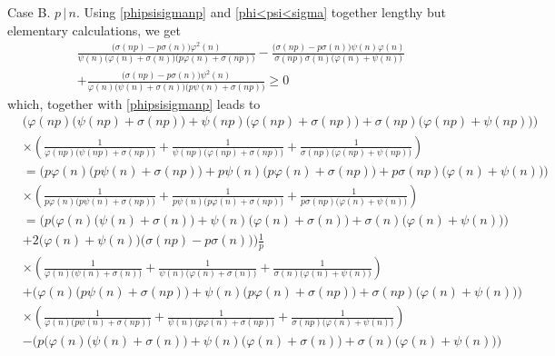 \documentclass[12pt]{article}
\begin{document}
Case B.  \;  $p\,|\,n$. Using \eqref{phipsisigmanp} and \eqref{phi<psi<sigma} together  lengthy but elementary calculations, we get
\begin{align}\label{CaseB}
&\frac{\big(\sigma(np)-p\sigma(n)\big)\varphi^2(n)}{\psi(n)\big(\varphi(n)+\sigma(n)\big)\big(p\varphi(n)+\sigma(np)\big)}
-\frac{\big(\sigma(np)-p\sigma(n)\big)\psi(n)\varphi(n)}{\sigma(np)\sigma(n)\big(\varphi(n)+\psi(n)\big)}\nonumber\\
&+\frac{\big(\sigma(np)-p\sigma(n)\big)\psi^2(n)}{\varphi(n)\big(\psi(n)+\sigma(n)\big)\big(p\psi(n)+\sigma(np)\big)}\geq0
\end{align}
which, together with \eqref{phipsisigmanp} leads to
\begin{align*}
&\Big(\varphi(np)\big(\psi(np)+\sigma(np)\big)+\psi(np)\big(\varphi(np)+\sigma(np)\big)+\sigma(np)\big(\varphi(np)+\psi(np)\big)\Big)\\
&\times\left(\frac{1}{\varphi(np)\big(\psi(np)+\sigma(np)\big)}+\frac{1}{\psi(np)\big(\varphi(np)+\sigma(np)\big)}+\frac{1}{\sigma(np)\big(\varphi(np)+\psi(np)\big)}\right)\\
&=\Big(p\varphi(n)\big(p\psi(n)+\sigma(np)\big)+p\psi(n)\big(p\varphi(n)+\sigma(np)\big)+p\sigma(np)\big(\varphi(n)+\psi(n)\big)\Big)\\
&\times\left(\frac{1}{p\varphi(n)\big(p\psi(n)+\sigma(np)\big)}+\frac{1}{p\psi(n)\big(p\varphi(n)+\sigma(np)\big)}+\frac{1}{p\sigma(np)\big(\varphi(n)+\psi(n)\big)}\right)\\
&=\bigg(p\Big(\varphi(n)\big(\psi(n)+\sigma(n)\big)+\psi(n)\big(\varphi(n)+\sigma(n)\big)+\sigma(n)\big(\varphi(n)+\psi(n)\big)\Big)\\
&+2\big(\varphi(n)+\psi(n)\big)\big(\sigma(np)-p\sigma(n)\big)\bigg)\frac{1}{p}\\
&\times\left(\frac{1}{\varphi(n)\big(\psi(n)+\sigma(n)\big)}+\frac{1}{\psi(n)\big(\varphi(n)+\sigma(n)\big)}+\frac{1}{\sigma(n)\big(\varphi(n)+\psi(n)\big)}\right)\\
&+\Big(\varphi(n)\big(p\psi(n)+\sigma(np)\big)+\psi(n)\big(p\varphi(n)+\sigma(np)\big)+\sigma(np)\big(\varphi(n)+\psi(n)\big)\Big)\\
&\times\left(\frac{1}{\varphi(n)\big(p\psi(n)+\sigma(np)\big)}+\frac{1}{\psi(n)\big(p\varphi(n)+\sigma(np)\big)}+\frac{1}{\sigma(np)\big(\varphi(n)+\psi(n)\big)}\right)\\
&-\bigg(p\Big(\varphi(n)\big(\psi(n)+\sigma(n)\big)+\psi(n)\big(\varphi(n)+\sigma(n)\big)+\sigma(n)\big(\varphi(n)+\psi(n)\big)\Big)\\

\end{align*}
\end{document}
